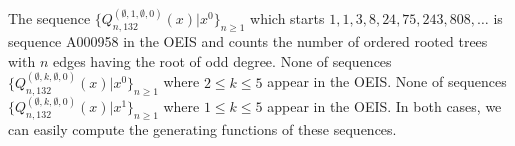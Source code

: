 \documentclass[
final,nomarks
]{dmtcs-episciences}
\newcommand{\Qmmn}[2]{Q_{#2,132}^{(#1)}(x)}
\begin{document}
The sequence \begin{math}\{\Qmmn{\emptyset,1,\emptyset,0}{n}\big\vert{x^0}\}_{n \geq 1}\end{math} which 
starts \begin{math}1,1,3,8,24,75,243,808, \ldots\end{math} is sequence A000958 in the OEIS and 
counts the number of ordered rooted trees with \begin{math}n\end{math} edges having the root of odd degree. 
None of  sequences \begin{math}\{\Qmmn{\emptyset,k,\emptyset,0}{n}\big\vert{x^0}\}_{n \geq 1}\end{math} where 
\begin{math}2 \leq k \leq 5\end{math} appear in the OEIS. 
None of  sequences \begin{math}\{\Qmmn{\emptyset,k,\emptyset,0}{n}\big\vert{x^1}\}_{n \geq 1}\end{math} where 
\begin{math}1 \leq k \leq 5\end{math} appear in the OEIS. 
In both cases, we can easily compute the generating functions of these sequences. 
\end{document}
